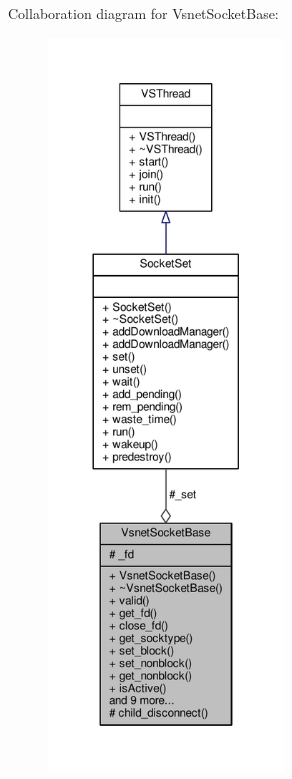 Collaboration diagram for Vsnet\+Socket\+Base\+:
\nopagebreak
\begin{figure}[H]
\begin{center}
\leavevmode
\includegraphics[height=550pt]{d1/d72/classVsnetSocketBase__coll__graph}
\end{center}
\end{figure}
